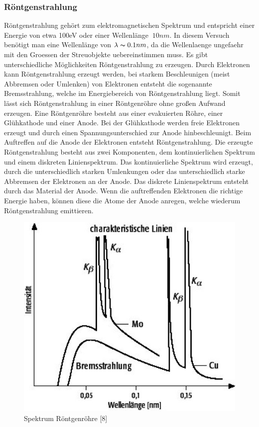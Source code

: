         \subsubsection{Röntgenstrahlung}    
            Röntgenstrahlung gehört zum elektromagnetischen Spektrum und entspricht einer Energie von etwa
            100eV oder einer Wellenlänge $~10 nm$. In diesem Versuch benötigt man eine Wellenlänge von $\lambda \thicksim 0.1 nm$, da 
            die Wellenlaenge ungefaehr mit den Groessen der Streuobjekte uebereinstimmen muss. Es gibt unterschiedliche Möglichkeiten Röntgenstrahlung zu erzeugen. 
            Durch Elektronen kann Röntgenstrahlung erzeugt werden, bei starkem Beschleunigen (meist Abbremsen oder Umlenken) von Elektronen entsteht die sogenannte Bremsstrahlung, welche im Energiebereich
            von Röntgenstrahlung liegt. Somit lässt sich Röntgenstrahlung in einer Röntgenröhre ohne großen Aufwand erzeugen.
            Eine Röntgenröhre besteht aus einer evakuierten Röhre, einer Glühkathode und einer Anode. Bei der Glühkathode werden
            freie Elektronen erzeugt und durch einen Spannungsunterschied zur Anode hinbeschleunigt. Beim Auftreffen auf die Anode
            der Elektronen entsteht Röntgenstrahlung. Die erzeugte Röntgenstrahlung besteht aus zwei Komponenten, dem kontinuierlichen Spektrum
            und einem diskreten Linienspektrum. Das kontinuierliche Spektrum wird erzeugt, durch die unterschiedlich starken Umlenkungen oder das unterschiedlich starke
            Abbremsen der Elektronen an der Anode.
            Das diskrete Linienspektrum entsteht durch das Material der Anode. Wenn die auftreffenden Elektronen die richtige Energie haben, 
            können diese die Atome der Anode anregen, welche wiederum Röntgenstrahlung emittieren.
            \begin{figure}[H]
                \centering
                \includegraphics{images/Spektrum_Röntgenröhre.jpg}
                \caption{Spektrum Röntgenröhre [8]}
            \end{figure}

